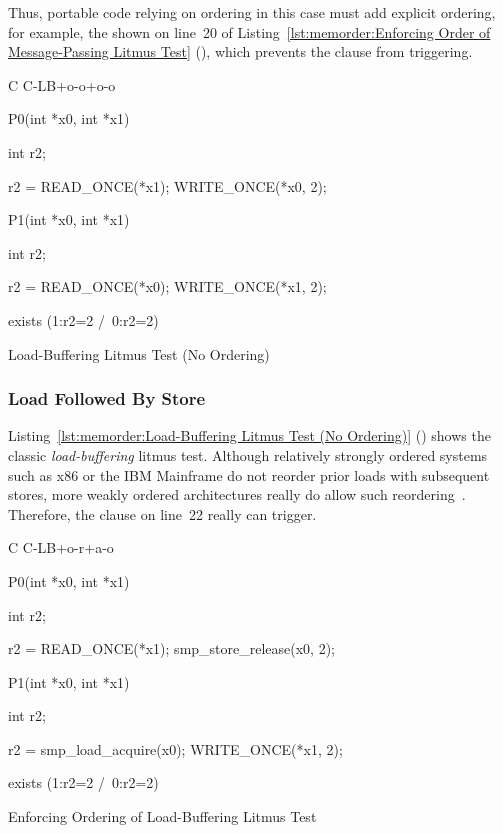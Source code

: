 Thus, portable code relying on ordering in this case must
add explicit ordering, for example, the  shown on
line~20 of
Listing~\ref{lst:memorder:Enforcing Order of Message-Passing Litmus Test}
(), which prevents
the  clause from triggering.

\begin{listing}[tbp]
{ \scriptsize
\begin{verbbox}[\LstLineNo]
C C-LB+o-o+o-o
{
}

P0(int *x0, int *x1)
{
  int r2;

  r2 = READ_ONCE(*x1);
  WRITE_ONCE(*x0, 2);
}


P1(int *x0, int *x1)
{
  int r2;

  r2 = READ_ONCE(*x0);
  WRITE_ONCE(*x1, 2);
}

exists (1:r2=2 /\ 0:r2=2)
\end{verbbox}
}
\centering
\theverbbox
\caption{Load-Buffering Litmus Test (No Ordering)}
\label{lst:memorder:Load-Buffering Litmus Test (No Ordering)}
\end{listing}

\subsubsection{Load Followed By Store}
\label{sec:memorder:Load Followed By Store}

Listing~\ref{lst:memorder:Load-Buffering Litmus Test (No Ordering)}
()
shows the classic \emph{load-buffering} litmus test.
Although relatively strongly ordered systems such as x86
or the IBM Mainframe do not reorder prior loads with subsequent stores,
more weakly ordered architectures really do allow such
reordering~\cite{JadeAlglave2011ppcmem}.
Therefore, the  clause on line~22 really can trigger.

\begin{listing}[tbp]
{ \scriptsize
\begin{verbbox}[\LstLineNo]
C C-LB+o-r+a-o
{
}

P0(int *x0, int *x1)
{
  int r2;

  r2 = READ_ONCE(*x1);
  smp_store_release(x0, 2);
}


P1(int *x0, int *x1)
{
  int r2;

  r2 = smp_load_acquire(x0);
  WRITE_ONCE(*x1, 2);
}

exists (1:r2=2 /\ 0:r2=2)
\end{verbbox}
}
\centering
\theverbbox
\caption{Enforcing Ordering of Load-Buffering Litmus Test}
\label{lst:memorder:Enforcing Ordering of Load-Buffering Litmus Test}
\end{listing}

